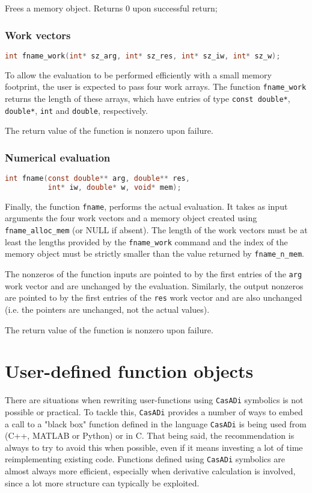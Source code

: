 \documentclass[a4paper,12pt]{book}
\newcommand{\CasADi}{\texttt{CasADi}\xspace}
\newcommand{\cxx}[1]{\lstinline[language=C++]{#1}}
\begin{document}
Frees a memory object. Returns 0 upon successful return;

\subsection*{Work vectors}
\begin{lstlisting}[language=C]
int fname_work(int* sz_arg, int* sz_res, int* sz_iw, int* sz_w);
\end{lstlisting}

To allow the evaluation to be performed efficiently with a small memory
footprint, the user is expected to pass four work arrays. The function
\verb|fname_work| returns the length of these arrays, which have entries
of type \verb|const double*|, \verb|double*|, \verb|int| and \verb|double|,
respectively.

The return value of the function is nonzero upon failure.

\subsection*{Numerical evaluation}
\begin{lstlisting}[language=C]
int fname(const double** arg, double** res,
          int* iw, double* w, void* mem);
\end{lstlisting}

Finally, the function \verb|fname|, performs the actual evaluation. It takes
as input arguments the four work vectors and a memory object created using \verb|fname_alloc_mem|
(or NULL if absent).
The length of the work vectors must be at least the lengths provided
by the \cxx{fname_work} command and the index of the memory object must be strictly
smaller than the value returned by \cxx{fname_n_mem}.

The nonzeros of the function inputs are pointed to by the
first entries of the \texttt{arg} work vector and are unchanged by the evaluation.
Similarly, the output nonzeros are pointed to by the first entries of the
\texttt{res} work vector and are also unchanged (i.e. the pointers are unchanged,
not the actual values).

The return value of the function is nonzero upon failure.


\chapter{User-defined function objects} \label{ch:user-defined}
There are situations when rewriting user-functions using \CasADi symbolics is not
possible or practical. To tackle this, \CasADi provides a number of ways to
embed a call to a "black box" function defined in the language \CasADi is being
used from (C++, MATLAB or Python) or in C.
That being said, the recommendation is always to try to avoid this when possible,
even if it means investing a lot of time reimplementing existing code.
Functions defined using \CasADi symbolics are almost always more
efficient, especially when derivative calculation is involved, since a lot more
structure can typically be exploited.
\end{document}

